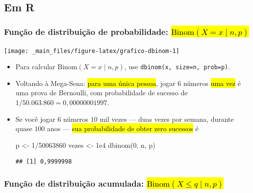 \documentclass[
  11pt]{report}
\newenvironment{Shaded}{\begin{snugshade}}{\end{snugshade}}
\newcommand{\DecValTok}[1]{\textcolor[rgb]{0.00,0.00,0.81}{#1}}
\newcommand{\FloatTok}[1]{\textcolor[rgb]{0.00,0.00,0.81}{#1}}
\newcommand{\FunctionTok}[1]{\textcolor[rgb]{0.00,0.00,0.00}{#1}}
\newcommand{\NormalTok}[1]{#1}
\newcommand{\OtherTok}[1]{\textcolor[rgb]{0.56,0.35,0.01}{#1}}
\newcommand{\SpecialCharTok}[1]{\textcolor[rgb]{0.00,0.00,0.00}{#1}}
\renewenvironment{Shaded}{
    \begin{mdframed}[%
      roundcorner=2pt,%
      innerleftmargin=5pt,%
      innerrightmargin=5pt,%
      topline=true,%
      leftline=true,%
      rightline=true,%
      bottomline=true,%
      linewidth=0.5pt,%
      linecolor=black!20,%
      backgroundcolor=black!2,%
      skipabove=2ex,%
      skipbelow=2.5ex%
    ]%
  }
  {
    \end{mdframed}
  }
\begin{document}
\hypertarget{em-r-3}{%
\subsection{Em R}\label{em-r-3}}

\hypertarget{funuxe7uxe3o-de-distribuiuxe7uxe3o-de-probabilidade-textbinomx-x-mid-n-p}{%
\subsubsection*{\texorpdfstring{Função de distribuição de probabilidade: {\hl{$\text{Binom}(X = x \mid n, p)$}}}{Função de distribuição de probabilidade: }}\label{funuxe7uxe3o-de-distribuiuxe7uxe3o-de-probabilidade-textbinomx-x-mid-n-p}}

\begin{center}\texttt{[image: \_main\_files/figure-latex/grafico-dbinom-1]} \end{center}

\begin{itemize}
\item
  Para calcular $\text{Binom}(X = x \mid n, p)$, use \texttt{dbinom(x,\ size=n,\ prob=p)}.
\item
  Voltando à Mega-Sena: {\hl{para uma única pessoa}}, jogar $6$ números {\hl{uma vez}} é uma prova de Bernoulli, com probabilidade de sucesso de $1/50.063.860 = 0{,}00000001997$.
\item
  Se você jogar $6$ números $10$ mil vezes --- duas vezes por semana, durante quase $100$ anos --- {\hl{sua probabilidade de obter zero sucessos}} é

\begin{Shaded}
\begin{Highlighting}[]
\NormalTok{p }\OtherTok{\textless{}{-}} \DecValTok{1}\SpecialCharTok{/}\DecValTok{50063860}
\NormalTok{vezes }\OtherTok{\textless{}{-}} \FloatTok{1e4}
\FunctionTok{dbinom}\NormalTok{(}\DecValTok{0}\NormalTok{, n, p)}
\end{Highlighting}
\end{Shaded}

\begin{verbatim}
## [1] 0,9999998
\end{verbatim}
\end{itemize}

\hypertarget{funuxe7uxe3o-de-distribuiuxe7uxe3o-acumulada-textbinomx-leq-q-mid-n-p}{%
\subsubsection*{\texorpdfstring{Função de distribuição acumulada: {\hl{$\text{Binom}(X \leq q \mid n, p)$}}}{Função de distribuição acumulada: }}\label{funuxe7uxe3o-de-distribuiuxe7uxe3o-acumulada-textbinomx-leq-q-mid-n-p}}
\end{document}
